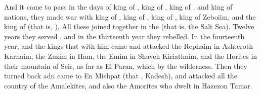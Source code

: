 
\bverse And it came to pass in the days of  king of ,  king of ,  king of , and  king of nations, 
\bverse \that they made war with  king of ,  king of ,  king of ,  king of Zeboiim, and the king of  (that is, ).
\bverse All these joined together in the  (that is, the Salt Sea).
\bverse Twelve years they served , and in the thirteenth year they rebelled.
\bverse In the fourteenth year,  and the kings that \were with him came and attacked the Rephaim in Ashteroth Karnaim, the Zuzim in Ham, the Emim in Shaveh Kiriathaim,
\bverse and the Horites in their mountain of Seir, as far as El Paran, which \is by the wilderness.
\bverse Then they turned back adn came to En Mishpat (that \is, Kadesh), and attacked all the country of the Amalekites, and also the Amorites who dwelt in Hazezon Tamar.



